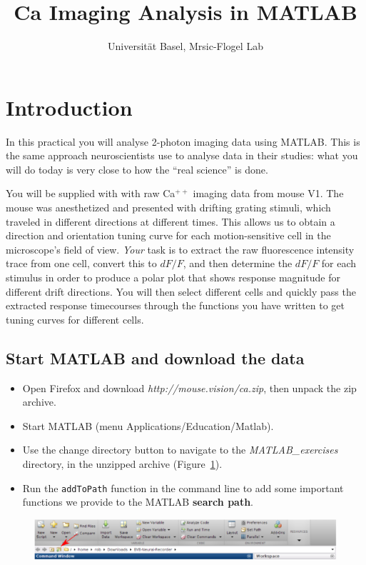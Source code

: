 \documentclass[paper=a4, fontsize=11pt]{article} %
\title{Ca\supr{++} Imaging Analysis in MATLAB}
\author{Universit\"{a}t Basel, Mrsic-Flogel Lab}
\date{}
\numberwithin{equation}{section} %
\numberwithin{figure}{section} %
\numberwithin{table}{section} %
\newcommand{\supr}[1]{\ensuremath{^{#1}}}
\begin{document}
\maketitle %


\section*{Introduction}

In this practical you will analyse 2-photon imaging data using MATLAB. This is the same approach 
neuroscientists use to analyse data in their studies: what you will do today is very close to how the ``real science'' is done. 

You will be supplied with with raw Ca\supr{++} imaging data from mouse V1. The mouse 
was anesthetized and presented with drifting grating stimuli, which traveled in different directions at different times. 
This allows us to obtain a direction and orientation tuning curve for each motion-sensitive cell in the microscope's field of view.
\textit{Your} task is to extract the raw fluorescence intensity trace from one cell, convert this to $dF/F$, and then 
determine the $dF/F$ for each stimulus in order to produce a polar plot that shows response magnitude
for different drift directions. You will then  select different cells and quickly pass the extracted 
response timecourses through the functions you have written to get tuning curves for different cells. 



\subsection*{Start MATLAB and download the data}
\begin{itemize}
\setlength{\parskip}{0.25em}
\item Open Firefox and download \textit{http://mouse.vision/ca.zip}, then unpack the zip archive.
\item Start MATLAB (menu Applications/Education/Matlab).
\item Use the change directory button to navigate to the \emph{MATLAB\_exercises} directory, in the unzipped archive (Figure~\ref{fig:toolbar}). 
\item Run the \texttt{addToPath} function in the command line to add some important functions we provide to the MATLAB
\textbf{search path}.
\end{itemize}


\begin{figure}[h]
    \centering
    \includegraphics[width=\textwidth]{change_dir.eps}
    \caption{}
    \label{fig:toolbar}
\end{figure}
\end{document}
